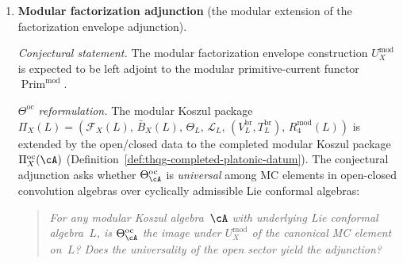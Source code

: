 \begin{enumerate}[resume, label=\textup{(\arabic*)}]
 \smallskip\noindent
 \emph{$\Theta^{\mathrm{oc}}$ reformulation.}
 The filtered derived DS functor
 $\mathbf R\mathrm{DS}_f$ of
 Definition~\ref{def:filtered-derived-ds-functor}
 should induce a morphism of open-closed convolution algebras
 $\mathrm{DS}_f^{\mathrm{oc}} \colon
 \mathfrak{g}^{\mathrm{oc}}_{V_k}
 \to
 \mathfrak{g}^{\mathrm{oc}}_{\mathcal{W}_k(\fg,f)}$
 satisfying:
 \begin{quote}
 \emph{$\mathrm{DS}_f^{\mathrm{oc}}
 (\Theta^{\mathrm{oc}}_{V_k(\fg)})
 = \Theta^{\mathrm{oc}}_{\mathcal{W}_k(\fg,f)}$.}
 \end{quote}
In words: DS reduction is a morphism of modular Koszul packages.
 The underived arrow
 $\mathrm{DS}_f \colon V_k(\fg)\to\mathcal W_k(\fg,f)$ is used only
 on the exact lane where $H^0\mathbf R\mathrm{DS}_f$ computes the
 derived functor. The exact-lane statement is proved for principal~$f$;
 for hook-type in type~$A$
 it is conditional on DS-bar compatibility
 (Theorem~\ref{thm:hook-transport-corridor}). The general case
 reduces to filtration formality ($E_1$-degeneration of the
 Kazhdan filtration spectral sequence) of the BRST complex
 (Remark~\ref{rem:ds-kd-formality-route}). The
 $\Theta^{\mathrm{oc}}$ formulation makes the target precise:
 the MC element must be preserved under a specific morphism
 of convolution algebras, which is stronger than commutativity
 of functors.

\item \textbf{Modular factorization adjunction}
 (the modular extension of the factorization envelope adjunction).

 \smallskip\noindent
 \emph{Conjectural statement.}
 The modular factorization envelope construction
 $U^{\mathrm{mod}}_X$ is expected to be left adjoint to the
 modular primitive-current functor
 $\operatorname{Prim}^{\mathrm{mod}}$.

 \smallskip\noindent
 \emph{$\Theta^{\mathrm{oc}}$ reformulation.}
 The modular Koszul package
 $\Pi_X(L) = (\mathcal{F}_X(L),\, \bar{B}_X(L),\, \Theta_L,\,
 \mathcal{L}_L,\, (V^{\mathrm{br}}_L, T^{\mathrm{br}}_L),\,
 R^{\mathrm{mod}}_4(L))$
 is extended by the open/closed data to the completed
 modular Koszul package $\Pi^{\mathrm{oc}}_X(\cA)$
 (Definition~\ref{def:thqg-completed-platonic-datum}). The
 conjectural adjunction asks whether
 $\Theta^{\mathrm{oc}}_\cA$ is \emph{universal} among MC
 elements in open-closed convolution algebras over cyclically
 admissible Lie conformal algebras:
 \begin{quote}
 \emph{For any modular Koszul algebra~$\cA$ with underlying
 Lie conformal algebra~$L$, is
 $\Theta^{\mathrm{oc}}_\cA$
 the image under $U^{\mathrm{mod}}_X$ of the canonical
 MC element on~$L$? Does the universality of the open sector
 yield the adjunction?}
 \end{quote}


\end{enumerate}
